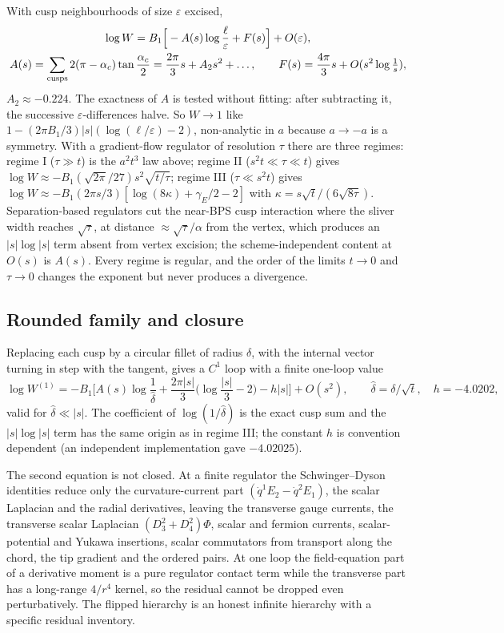 With cusp neighbourhoods of size $\varepsilon$ excised,
\begin{equation}
\begin{gathered}
\log W=B_1\Big[-A(s)\log\frac\ell\varepsilon+F(s)\Big]+O(\varepsilon),\\
A(s)=\sum_{\rm cusps}2(\pi-\alpha_c)\tan\frac{\alpha_c}2=\frac{2\pi}3s+A_2s^2+\dots,\qquad F(s)=\frac{4\pi}3s+O(s^2\log\tfrac1s),
\end{gathered}
\label{eq:oneloop}
\end{equation}
$A_2\approx-0.224$. The exactness of $A$ is tested without fitting: after subtracting it, the successive
$\varepsilon$-differences halve. So $W\to1$ like $1-(2\pi B_1/3)|s|(\log(\ell/\varepsilon)-2)$, non-analytic in $a$
because $a\to-a$ is a symmetry. With a gradient-flow regulator of resolution $\tau$ there are three regimes:
regime I ($\tau\gg t$) is the $a^2t^3$ law above; regime II ($s^2t\ll\tau\ll t$) gives
$\log W\approx-B_1(\sqrt{2\pi}/27)s^2\sqrt{t/\tau}$; regime III ($\tau\ll s^2t$) gives
$\log W\approx-B_1(2\pi s/3)[\log(8\kappa)+\gamma_E/2-2]$ with $\kappa=s\sqrt t/(6\sqrt{8\tau})$. Separation-based
regulators cut the near-BPS cusp interaction where the sliver width reaches $\sqrt\tau$, at distance
$\approx\sqrt\tau/\alpha$ from the vertex, which produces an $|s|\log|s|$ term absent from vertex excision; the
scheme-independent content at $O(s)$ is $A(s)$. Every regime is regular, and the order of the limits $t\to0$ and
$\tau\to0$ changes the exponent but never produces a divergence.

\subsection{Rounded family and closure}

Replacing each cusp by a circular fillet of radius $\delta$, with the internal vector turning in step with the
tangent, gives a $C^1$ loop with a finite one-loop value
\begin{equation}
\log W^{(1)}=-B_1\Big[A(s)\log\frac1{\hat\delta}+\frac{2\pi|s|}{3}\Big(\log\frac{|s|}3-2\Big)-h|s|\Big]+O(s^2),\qquad
\hat\delta=\delta/\sqrt t,\quad h=-4.0202,
\end{equation}
valid for $\hat\delta\ll|s|$. The coefficient of $\log(1/\hat\delta)$ is the exact cusp sum and the $|s|\log|s|$ term
has the same origin as in regime III; the constant $h$ is convention dependent (an independent implementation gave
$-4.02025$).

The second equation is not closed. At a finite regulator the Schwinger--Dyson identities reduce only the
curvature-current part $(\dot q^1E_2-\dot q^2E_1)$, the scalar Laplacian and the radial derivatives, leaving
the transverse gauge currents, the transverse scalar Laplacian $(D_3^2+D_4^2)\Phi$, scalar and fermion currents,
scalar-potential and Yukawa insertions, scalar commutators from transport along the chord, the tip gradient and
the ordered pairs. At one loop the field-equation part of a derivative moment is a pure regulator contact term
while the transverse part has a long-range $4/r^4$ kernel, so the residual cannot be dropped even
perturbatively. The flipped hierarchy is an honest infinite hierarchy with a specific residual inventory.

